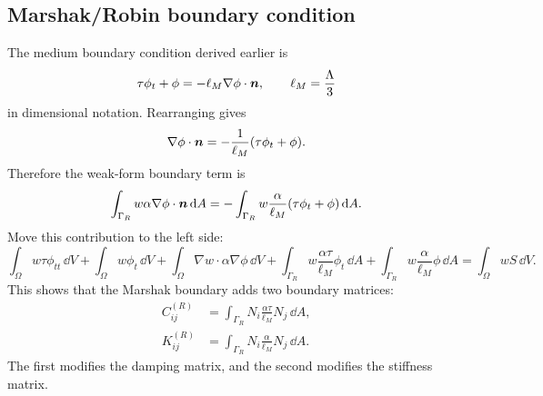 \documentclass[11pt]{article}
\begin{document}
\subsection{Marshak/Robin boundary condition}
The medium boundary condition derived earlier is
\begin{equation}
    \tau\phi_t+\phi=-\ell_M\nabla\phi\cdot\bm{n},
    \qquad
    \ell_M=\frac{\Lambda}{3}
    \label{eq:marshak_general_phi}
\end{equation}
in dimensional notation. Rearranging gives
\begin{equation}
    \nabla\phi\cdot\bm{n}=-\frac{1}{\ell_M}(\tau\phi_t+\phi).
\end{equation}
Therefore the weak-form boundary term is
\begin{equation}
    \int_{\Gamma_R}w\alpha\nabla\phi\cdot\bm{n}\,\dd A
    =-\int_{\Gamma_R}w\frac{\alpha}{\ell_M}(\tau\phi_t+\phi)\,\dd A.
\end{equation}
Move this contribution to the left side:
\begin{equation}
    \int_{\Omega} w\tau\phi_{tt}\,\dd V
    +\int_{\Omega} w\phi_t\,\dd V
    +\int_{\Omega}\nabla w\cdot\alpha\nabla\phi\,\dd V
    +\int_{\Gamma_R}w\frac{\alpha\tau}{\ell_M}\phi_t\,\dd A
    +\int_{\Gamma_R}w\frac{\alpha}{\ell_M}\phi\,\dd A
    =\int_\Omega wS\,\dd V.
\end{equation}
This shows that the Marshak boundary adds two boundary matrices:
\begin{align}
    C^{(R)}_{ij} &=\int_{\Gamma_R}N_i\frac{\alpha\tau}{\ell_M}N_j\,\dd A,\\
    K^{(R)}_{ij} &=\int_{\Gamma_R}N_i\frac{\alpha}{\ell_M}N_j\,\dd A.
\end{align}
The first modifies the damping matrix, and the second modifies the stiffness matrix.
\end{document}
